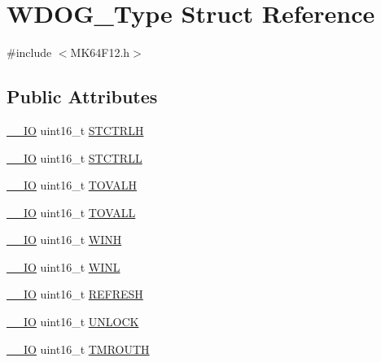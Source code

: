 \hypertarget{structWDOG__Type}{}\section{W\+D\+O\+G\+\_\+\+Type Struct Reference}
\label{structWDOG__Type}


{\ttfamily \#include $<$M\+K64\+F12.\+h$>$}

\subsection*{Public Attributes}
\begin{DoxyCompactItemize}
\item 
\hyperlink{core__sc300_8h_aec43007d9998a0a0e01faede4133d6be}{\+\_\+\+\_\+\+IO} uint16\+\_\+t \hyperlink{structWDOG__Type_a11f8029e735f8e5a5747eae9c4ab666c}{S\+T\+C\+T\+R\+LH}
\item 
\hyperlink{core__sc300_8h_aec43007d9998a0a0e01faede4133d6be}{\+\_\+\+\_\+\+IO} uint16\+\_\+t \hyperlink{structWDOG__Type_a2c4f1d84d552c73603e6ecd7baae96c6}{S\+T\+C\+T\+R\+LL}
\item 
\hyperlink{core__sc300_8h_aec43007d9998a0a0e01faede4133d6be}{\+\_\+\+\_\+\+IO} uint16\+\_\+t \hyperlink{structWDOG__Type_ad21f1f265d08c252fb57e35399af5e4d}{T\+O\+V\+A\+LH}
\item 
\hyperlink{core__sc300_8h_aec43007d9998a0a0e01faede4133d6be}{\+\_\+\+\_\+\+IO} uint16\+\_\+t \hyperlink{structWDOG__Type_a3f94863d1793cd3c49bf604407d57a1f}{T\+O\+V\+A\+LL}
\item 
\hyperlink{core__sc300_8h_aec43007d9998a0a0e01faede4133d6be}{\+\_\+\+\_\+\+IO} uint16\+\_\+t \hyperlink{structWDOG__Type_a4608cedb5b58dd05e3b21bca39c0bd21}{W\+I\+NH}
\item 
\hyperlink{core__sc300_8h_aec43007d9998a0a0e01faede4133d6be}{\+\_\+\+\_\+\+IO} uint16\+\_\+t \hyperlink{structWDOG__Type_a90d84b2d35ad1badbf17fbcb333583ad}{W\+I\+NL}
\item 
\hyperlink{core__sc300_8h_aec43007d9998a0a0e01faede4133d6be}{\+\_\+\+\_\+\+IO} uint16\+\_\+t \hyperlink{structWDOG__Type_a9ddd941eefce6239d2e0341bc7fb7ca9}{R\+E\+F\+R\+E\+SH}
\item 
\hyperlink{core__sc300_8h_aec43007d9998a0a0e01faede4133d6be}{\+\_\+\+\_\+\+IO} uint16\+\_\+t \hyperlink{structWDOG__Type_ac74551f3b44a50f8c6cd440d68a943f5}{U\+N\+L\+O\+CK}
\item 
\hyperlink{core__sc300_8h_aec43007d9998a0a0e01faede4133d6be}{\+\_\+\+\_\+\+IO} uint16\+\_\+t \hyperlink{structWDOG__Type_aeccf8f74411e12e6f188789a39dee264}{T\+M\+R\+O\+U\+TH}

\end{DoxyCompactItemize}
